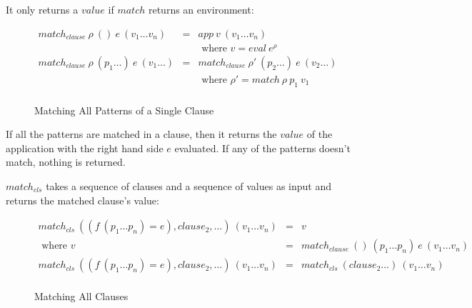 \documentclass[acmsmall]{acmart}
\begin{document}
It only returns a $value$ if $match$ returns an environment:

\begin{figure}[H]
  \begin{equation*}
    \begin{aligned}
      match_{clause} \: \rho \: () \: e \: (v_1 \dots v_n)      & = & app \: v \: (v_1 \dots v_n)                                \\
                                                                &   & \textrm{ where } v = eval \: e^{\rho}                      \\
      match_{clause} \: \rho \: (p_1 \dots) \: e \: (v_1 \dots) & = & match_{clause} \: \rho' \: (p_2 \dots) \: e \: (v_2 \dots) \\
                                                                &   & \textrm{ where } \rho' = match \: \rho \: p_1 \: v_1       \\                                                        
    \end{aligned}
  \end{equation*}
  \caption{Matching All Patterns of a Single Clause}
\end{figure}

If all the patterns are matched in a clause, then it returns the $value$ of the application with the right hand side $e$ evaluated. If any of the patterns doesn't match, nothing is returned.

$match_{cls}$ takes a sequence of clauses and a sequence of values as input and returns the matched clause's value:

\begin{figure}[H]
  \begin{equation*}
    \begin{aligned}
      match_{cls} \: ((f \: (p_1 \dots p_n) = e), clause_2, \dots) \: (v_1 \dots v_n) & = & v                                                               \\
      \textrm{ where } v                                                              & = & match_{clause} \: () \: (p_1 \dots p_n) \: e \: (v_1 \dots v_n) \\
      match_{cls} \: ((f \: (p_1 \dots p_n) = e), clause_2, \dots) \: (v_1 \dots v_n) & = & match_{cls} \: (clause_2 \dots) \: (v_1 \dots v_n)              \\
    \end{aligned}
  \end{equation*}
  \caption{Matching All Clauses}
\end{figure}
\end{document}
